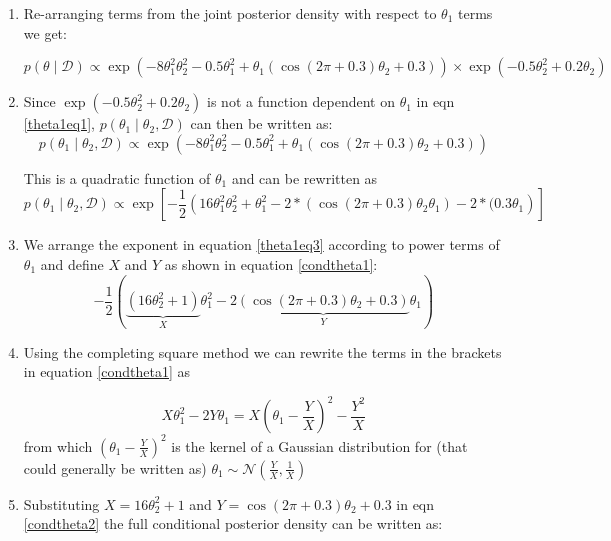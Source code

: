 \documentclass[12pt]{article}
\begin{document}
\begin{enumerate}
\item Re-arranging terms from the joint posterior density with respect to $\theta_1$ terms we get:

\begin{equation}\label{theta1eq1}
p(\theta \mid \mathcal{D}) \propto \exp \left( -8\theta_1^2\theta_2^2 - 0.5\theta_1^2 + \theta_1(\cos(2\pi + 0.3)\theta_2 + 0.3) \right) \times \exp \left( -0.5\theta_2^2 + 0.2\theta_2 \right)  
\end{equation} 
\item Since  $\exp \left( -0.5\theta_2^2 + 0.2\theta_2 \right)$  is not a function dependent on $\theta_1$ in eqn  \ref{theta1eq1}, $p(\theta_1 \mid \theta_2 ,\mathcal{D}) $ can then be written as:
 \begin{equation}\label{theta1eq2}
p(\theta_1 \mid \theta_2 ,\mathcal{D}) \propto \exp \left( -8\theta_1^2\theta_2^2 - 0.5\theta_1^2 + \theta_1(\cos(2\pi + 0.3)\theta_2 + 0.3) \right)
\end{equation} 

This is a quadratic function of $\theta_1$ and can be rewritten as   \begin{equation}\label{theta1eq3}
p(\theta_1 \mid \theta_2 ,\mathcal{D}) \propto \exp\left[- \frac{1}{2}\left( 16\theta_1^2\theta_2^2 + \theta_1^2 - 2*(\cos(2\pi + 0.3)\theta_2 \theta_1) - 2*(0.3\theta_1 \right)\right]
\end{equation} 

\item We arrange the exponent in equation \ref{theta1eq3} according to power terms of $\theta_1$ and define $X$ and $Y$ as shown in equation \ref{condtheta1}:
\begin{equation}\label{condtheta1}
-\frac{1}{2} \left( \underbrace{(16\theta_2^2 + 1)}_{X}\theta_1^2 - 2\underbrace{\left(\cos(2\pi + 0.3)\theta_2 + 0.3\right)}_{Y}\theta_1 \right)
\end{equation}

\item Using the completing square method we can rewrite the terms in the brackets in equation \ref{condtheta1} as 

\begin{equation}\label{condtheta2}
     X\theta_1^2 - 2Y\theta_1 = X\left(\theta_1 - \frac{Y}{X}\right)^2 - \frac{Y^2}{X}
\end{equation} from which $\left(\theta_1 - \frac{Y}{X}\right)^2$ is the kernel of a Gaussian distribution for (that could generally be written as)  $\theta_1 \sim \mathcal{N} \left(\frac{Y}{X}, \frac{1}{X} \right)$
\item Substituting \( X = 16\theta_2^2 + 1 \) and \( Y = \cos(2\pi + 0.3)\theta_2 + 0.3 \) in eqn \ref{condtheta2} the full conditional posterior density  can be written as:


\end{enumerate}
\end{document}
